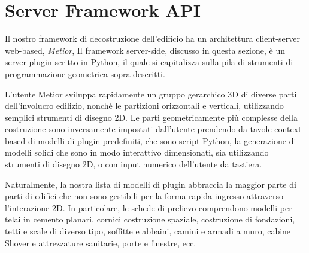 \section{Server Framework API}
\label{sec:chapter_3_section_6}

\noindent
Il nostro framework di decostruzione dell'edificio ha un architettura client-server web-based, \emph{Metior},
Il framework server-side, discusso in questa sezione, \`e un server plugin scritto in Python, il quale
si capitalizza sulla pila di strumenti di programmazione geometrica sopra descritti.


L'utente Metior sviluppa rapidamente un gruppo gerarchico 3D di diverse parti dell'involucro edilizio,
nonché le partizioni orizzontali e verticali, utilizzando semplici strumenti di disegno 2D.
Le parti geometricamente pi\`u complesse della costruzione sono inversamente impostati dall'utente prendendo
da tavole context-based di modelli di plugin predefiniti, che sono script Python, la generazione di modelli solidi che
sono in modo interattivo dimensionati, sia utilizzando strumenti di disegno 2D, o con input numerico dell'utente da tastiera.



Naturalmente, la nostra lista di modelli di plugin abbraccia la maggior parte di parti di edifici che non sono gestibili
per la forma rapida ingresso attraverso l'interazione 2D. In particolare, le schede di prelievo comprendono modelli per telai
in cemento planari, cornici costruzione spaziale, costruzione di fondazioni, tetti e scale di diverso tipo, soffitte e abbaini,
 camini e armadi a muro, cabine Shover e attrezzature sanitarie, porte e finestre, ecc.

